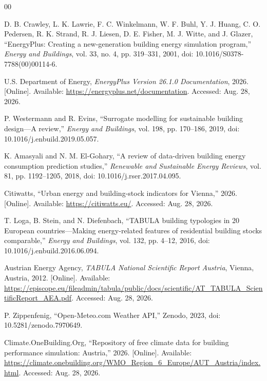 \documentclass[conference]{IEEEtran}
\begin{document}
\begin{thebibliography}{00}

D. B. Crawley, L. K. Lawrie, F. C. Winkelmann, W. F. Buhl, Y. J. Huang,
C. O. Pedersen, R. K. Strand, R. J. Liesen, D. E. Fisher, M. J. Witte, and
J. Glazer, ``EnergyPlus: Creating a new-generation building energy simulation
program,'' \textit{Energy and Buildings}, vol. 33, no. 4, pp. 319--331, 2001,
doi: 10.1016/S0378-7788(00)00114-6.

U.S. Department of Energy, \textit{EnergyPlus Version 26.1.0 Documentation},
2026. [Online]. Available: \url{https://energyplus.net/documentation}.
Accessed: Aug. 28, 2026.

P. Westermann and R. Evins, ``Surrogate modelling for sustainable building
design---A review,'' \textit{Energy and Buildings}, vol. 198, pp. 170--186,
2019, doi: 10.1016/j.enbuild.2019.05.057.

K. Amasyali and N. M. El-Gohary, ``A review of data-driven building energy
consumption prediction studies,'' \textit{Renewable and Sustainable Energy
Reviews}, vol. 81, pp. 1192--1205, 2018,
doi: 10.1016/j.rser.2017.04.095.

Citiwatts, ``Urban energy and building-stock indicators for Vienna,'' 2026.
[Online]. Available: \url{https://citiwatts.eu/}. Accessed: Aug. 28, 2026.

T. Loga, B. Stein, and N. Diefenbach, ``TABULA building typologies in 20
European countries---Making energy-related features of residential building
stocks comparable,'' \textit{Energy and Buildings}, vol. 132, pp. 4--12,
2016, doi: 10.1016/j.enbuild.2016.06.094.

Austrian Energy Agency, \textit{TABULA National Scientific Report Austria},
Vienna, Austria, 2012. [Online]. Available:
\url{https://episcope.eu/fileadmin/tabula/public/docs/scientific/AT_TABULA_ScientificReport_AEA.pdf}.
Accessed: Aug. 28, 2026.

P. Zippenfenig, ``Open-Meteo.com Weather API,'' Zenodo, 2023,
doi: 10.5281/zenodo.7970649.

Climate.OneBuilding.Org, ``Repository of free climate data for building
performance simulation: Austria,'' 2026. [Online]. Available:
\url{https://climate.onebuilding.org/WMO_Region_6_Europe/AUT_Austria/index.html}.
Accessed: Aug. 28, 2026.


\end{thebibliography}
\end{document}
